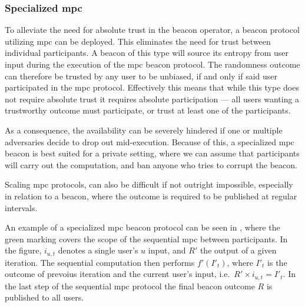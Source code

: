 \subsubsection{Specialized \gls{mpc}}\label{ssub:specialized_mpc}
To alleviate the need for absolute trust in the beacon operator, a beacon protocol utilizing \acrfull{mpc} can be deployed.
This eliminates the need for trust between individual participants.
A beacon of this type will source its entropy from user input during the execution of the \gls{mpc} beacon protocol.
The randomness outcome can therefore be trusted by any user to be unbiased, if and only if said user participated in the \gls{mpc} protocol.
Effectively this means that while this type does not require absolute trust it requires absolute participation --- all users wanting a trustworthy outcome must participate, or trust at least one of the participants.

As a consequence, the availability can be severely hindered if one or multiple adversaries decide to drop out mid-execution.
Because of this, a specialized \gls{mpc} beacon is best suited for a private setting, where we can assume that participants will carry out the computation, and ban anyone who tries to corrupt the beacon.

Scaling \gls{mpc} protocols, can also be difficult if not outright impossible, especially in relation to a beacon, where the outcome is required to be published at regular intervals.

An example of a specialized \gls{mpc} beacon protocol can be seen in , where the green marking covers the scope of the sequential \gls{mpc} between participants.
In the figure, $i_{u,t}$ denotes a single user's $u$ input, and $R'$ the output of a given iteration.
The sequential computation then performs $f'(I'_t)$, where $I'_t$ is the outcome of prevoius iteration and the current user's input, i.e.\ $R' \times i_{u,t} = I'_t$.
In the last step of the sequential \gls{mpc} protocol the final beacon outcome $R$ is published to all users.

